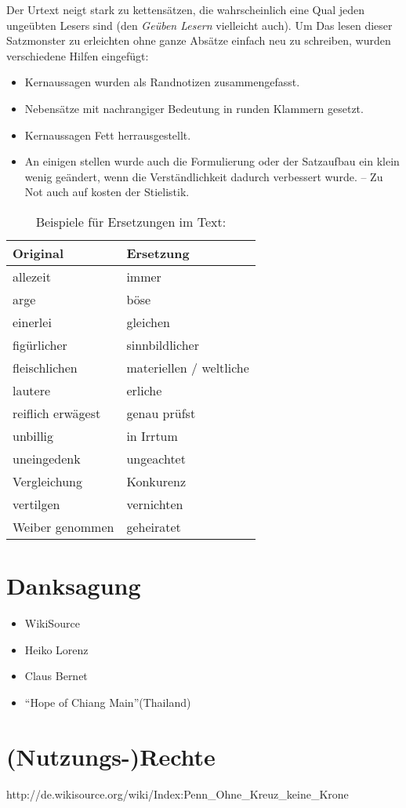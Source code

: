 \medskip

Der Urtext neigt stark zu kettensätzen, die wahrscheinlich eine Qual jeden
ungeübten Lesers sind (den \textit{Geüben Lesern} vielleicht auch). Um
Das lesen dieser Satzmonster zu erleichten ohne ganze Absätze einfach neu
zu schreiben, wurden verschiedene Hilfen eingefügt:

\begin{itemize}
 \item Kernaussagen wurden als Randnotizen zusammengefasst.
 \item Nebensätze mit nachrangiger Bedeutung in runden Klammern gesetzt.
 \item Kernaussagen Fett herrausgestellt.
 \item An einigen stellen wurde auch die Formulierung oder der Satzaufbau
 ein klein wenig geändert, wenn die Verständlichkeit dadurch verbessert wurde.
 -- Zu Not auch auf kosten der Stielistik.
\end{itemize}

\begin{table} \centering
\caption{Beispiele für Ersetzungen im Text:}
\begin{tabular}{|l|l|} \hline
\textbf{Original} 	& \textbf{Ersetzung} 		\\ \hline \hline
allezeit 		& immer  			\\ \hline
arge 			& böse  			\\ \hline
einerlei 		& gleichen 	 		\\ \hline
figürlicher 		& sinnbildlicher  		\\ \hline
fleischlichen  		& materiellen / weltliche  	\\ \hline
lautere 		& erliche   			\\ \hline
reiflich erwägest 	& genau prüfst 			\\ \hline
unbillig       		& in Irrtum  			\\ \hline
uneingedenk 		& ungeachtet			\\ \hline
Vergleichung 		& Konkurenz  			\\ \hline
vertilgen 		& vernichten			\\ \hline
Weiber genommen 	& geheiratet  			\\ \hline
 
\end{tabular} 

\end{table}

\chapter{Danksagung}

\begin{itemize}
 \item WikiSource
 \item Heiko Lorenz
 \item Claus Bernet
 \item "`Hope of Chiang Main"'(Thailand)
\end{itemize}


\chapter{(Nutzungs-)Rechte}
http://de.wikisource.org/wiki/Index:Penn\_Ohne\_Kreuz\_keine\_Krone
